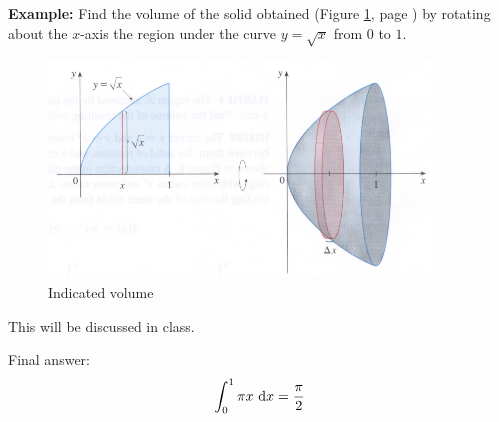 \documentclass[12pt,addpoints, answers, fleqn]{exam}
\begin{document}
\textbf{Example:} Find the volume of the solid obtained (Figure \ref{fig:graph3108}, page \pageref{fig:graph3108}) by rotating about the $x$-axis the region under the curve $y = \sqrt{x}$ from $0$ to $1$.
\begin{figure}[htbp] %
   \centering
   \includegraphics[width=4in]{./graphics/graph3108.pdf} 
   \caption{Indicated volume}
   \label{fig:graph3108}
\end{figure}

\begin{solution}
This will be discussed in class.

Final answer:
\[
\int_0^1 \pi x \ {\rm{d}} x = \frac{\pi}{2}
\]
\end{solution}
\end{document}
